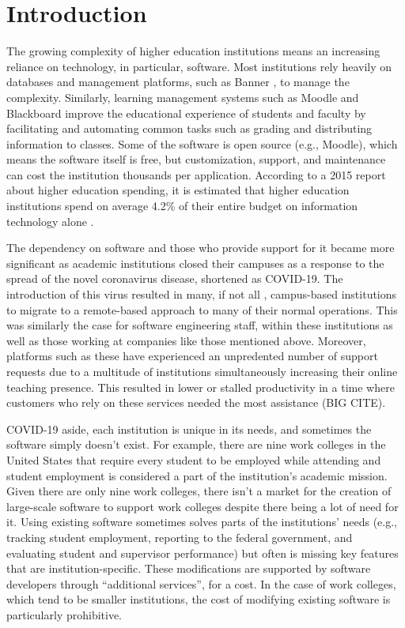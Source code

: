 \section{Introduction}

The growing complexity of higher education institutions means an increasing reliance on technology, in particular, software. Most institutions rely heavily on databases and management platforms, such as Banner \cite{BannerWebsite}, to manage the complexity. Similarly, learning management systems such as Moodle \cite{MoodleWebsite} and Blackboard \cite{BlackboardWebsite} improve the educational experience of students and faculty by facilitating and automating common tasks such as grading and distributing information to classes. Some of the software is open source (e.g., Moodle), which means the software itself is free, but customization, support, and maintenance can cost the institution thousands per application. According to a 2015 report about higher education spending, it is estimated that higher education institutions spend on average 4.2\% of their entire budget on information technology alone \cite{CDSBenchmarkReport}.

The dependency on software and those who provide support for it became more significant as academic institutions closed their campuses as a response to the spread of the novel coronavirus disease, shortened as COVID-19. The introduction of this virus resulted in many, if not all \cite{?}, campus-based institutions to migrate to a remote-based approach to many of their normal operations. This was similarly the case for software engineering staff, within these institutions as well as those working at companies like those mentioned above. Moreover, platforms such as these have experienced an unpredented number of support requests due to a multitude of institutions simultaneously increasing their online teaching presence. This resulted in lower or stalled productivity in a time where customers who rely on these services needed the most assistance (BIG CITE).

COVID-19 aside, each institution is unique in its needs, and sometimes the software simply doesn't exist. For example, there are nine work colleges in the United States \cite{WCCMembers, Ecclesia} that require every student to be employed while attending and student employment is considered a part of the institution's academic mission. Given there are only nine work colleges, there isn't a market for the creation of large-scale software to support work colleges despite there being a lot of need for it. Using existing software sometimes solves parts of the institutions’ needs (e.g., tracking student employment, reporting to the federal government, and evaluating student and supervisor performance) but often is missing key features that are institution-specific. These modifications are supported by software developers through “additional services”, for a cost. In the case of work colleges, which tend to be smaller institutions, the cost of modifying existing software is particularly prohibitive.

